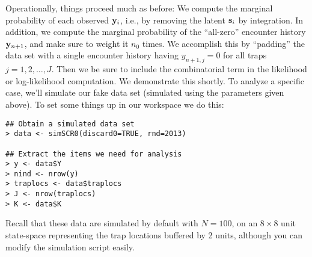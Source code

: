 Operationally, things proceed much as before: 
We compute the marginal probability of each observed ${\bf y}_{i}$,
i.e., by removing the latent ${\bf s}_{i}$ by integration. In
addition, we 
 compute the marginal probability of the ``all-zero'' encounter
history ${\bf y}_{n+1}$, and make sure to weight it $n_{0}$ times. We
accomplish this by ``padding'' the data set with a single encounter
history having $y_{n+1,j}=0$ for all traps $j=1,2,\ldots,J$. Then we
be sure to include the combinatorial term in the likelihood or
log-likelihood computation. We demonstrate this shortly.
To analyze a specific case, we'll simulate our fake data set (simulated
using the parameters given above). To set some things up in our
workspace we do this:
\begin{verbatim}
## Obtain a simulated data set
> data <- simSCR0(discard0=TRUE, rnd=2013)  

## Extract the items we need for analysis
> y <- data$Y
> nind <- nrow(y)
> traplocs <- data$traplocs
> J <- nrow(traplocs)
> K <- data$K
\end{verbatim}
Recall that these data are simulated by default with $N=100$, on an $8 \times 8$ unit
state-space representing the trap locations  buffered by 2 units,
although you can modify the simulation script easily.


